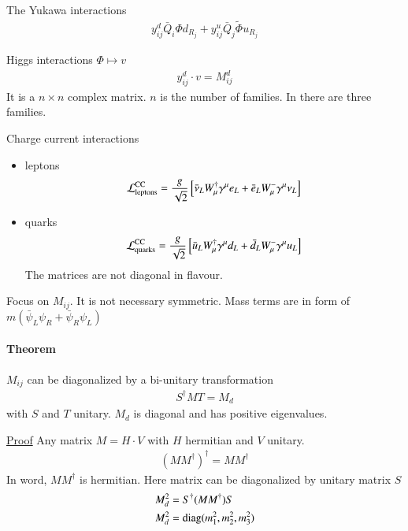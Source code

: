 The Yukawa interactions
\begin{align*}
   y_{ij}^d \bar{Q}_i \Phi d_{R_{j}} + y^u_{ij} \bar{Q}_j \tilde{\Phi} u_{R_j}
\end{align*}

Higgs interactions $\Phi \mapsto v$
\begin{align*}
   y^{d}_{ij} \cdot v = M^d_{ij}
\end{align*}
It is a $n \times n$ complex matrix. $n$ is the number of families. In \sm there are three families.

Charge current interactions
\begin{itemize}
   \item leptons
      \begin{align*}
         \mathcal{L}_{\text{leptons}}^{\text{CC}} = \frac{g}{\sqrt{2}} \left[ \bar{\nu}_L W_\mu^\dagger \gamma^\mu e_L + \bar{e}_L W_\mu^- \gamma^\mu \nu_L \right]
      \end{align*}
   \item quarks
      \begin{align*}
         \mathcal{L}_{\text{quarks}}^{\text{CC}} = \frac{g}{\sqrt{2}}\left[ \bar{u}_L W_\mu^\dagger \gamma^\mu d_L + \bar{d}_L W_\mu^- \gamma^\mu u_L \right]
      \end{align*}
      The matrices are not diagonal in flavour.
\end{itemize}

Focus on $M_{ij}$. It is not necessary symmetric. Mass terms are in form of $m(\bar{\psi}_L \psi_R + \bar{\psi}_R {\psi}_L)$

\paragraph{Theorem} $M_{ij}$ can be diagonalized by a bi-unitary transformation 
\begin{align}
   S^\dagger M T = M_d 
\end{align}
with $S$ and $T$ unitary. $M_d$ is diagonal and has positive eigenvalues.

\underline{Proof} Any matrix $M = H \cdot V$ with $H$ hermitian and $V$ unitary.
\begin{align*}
   (M M^\dagger )^\dagger = M M^\dagger
\end{align*}
In word, $MM^\dagger$ is hermitian. Here matrix can be diagonalized by unitary matrix $S$
\begin{align*}
   M^2_d &= S^\dagger (MM^\dagger) S  \\
   M_d^2 &= \text{diag}(m_1^2, m_2^2, m_3^2)
\end{align*}

